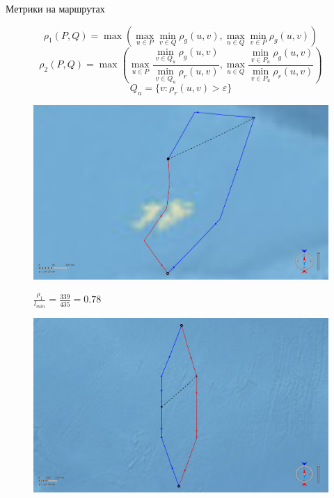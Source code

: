 \documentclass[russian, hyperref={unicode}]{beamer}
\begin{document}
\begin{frame}[t]{Метрики на маршрутах}
     {
        \begin{figure}[c]
            \begin{equation*}
                \rho_1 (P, Q) = \max(\max_{u \in P} \min_{v \in Q} \rho_g(u,
                v), \max_{u \in Q} \min_{v \in P} \rho_g(u, v))
            \end{equation*}
            \begin{equation*}
                \rho_2 (P, Q) = \max(\max_{u \in P} \frac{\min\limits_{v \in Q_u}
                \rho_g(u, v)}{\min\limits_{v \in Q_u} \rho_r(u, v)}, \max\limits_{u \in Q} \frac{\min\limits_{v \in P_u}
                \rho_g(u, v)}{\min\limits_{v \in P_u} \rho_r(u, v)})
            \end{equation*}
            \begin{equation*}
                Q_u = \{ v : \rho_r(u, v) > \varepsilon \}
            \end{equation*}
        \end{figure}
    }
     {
        \begin{figure}
            \includegraphics[width=.9\textwidth]{Solution/metrics/1-dissimilar}
            
            $\frac{\rho_1}{l_{min}} = \frac{339}{435} = 0.78$
        \end{figure}
    }
     {
        \begin{figure}
            \includegraphics[width=.9\textwidth]{Solution/metrics/1-uncertain-2-similar}
            

\end{figure}}
\end{frame}
\end{document}
